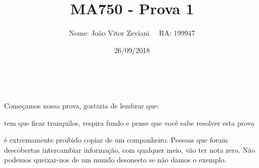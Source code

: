 \documentclass[a4paper,11pt]{article}
\title{MA750 - Prova 1}
\author{Nome: João Vitor Zeviani	 \ \ RA: 199947}
\date{26/09/2018}
\theoremstyle{definition}
\begin{document}
\begin{table}[htpb]
\maketitle
\renewcommand\contentsname{Conteúdo}
\tableofcontents
\ 

\hspace{.8cm} Começamos nossa prova, gostaria de lembrar que:

\begin{description}
\item[i)] tem que ficar tranquilos, respira fundo e pense que você sabe resolver esta prova
{\color{red} \item[ii)] é extremamente proibido copiar de um companheiro. Pessoas que foram descobertas intercambiar informação, com qualquer meio, vão ter nota zero. Não podemos queixar-nos de um mundo desonesto se não damos o exemplo.}
\end{description}
\end{table}
\vspace{-0.8cm}
\end{document}
